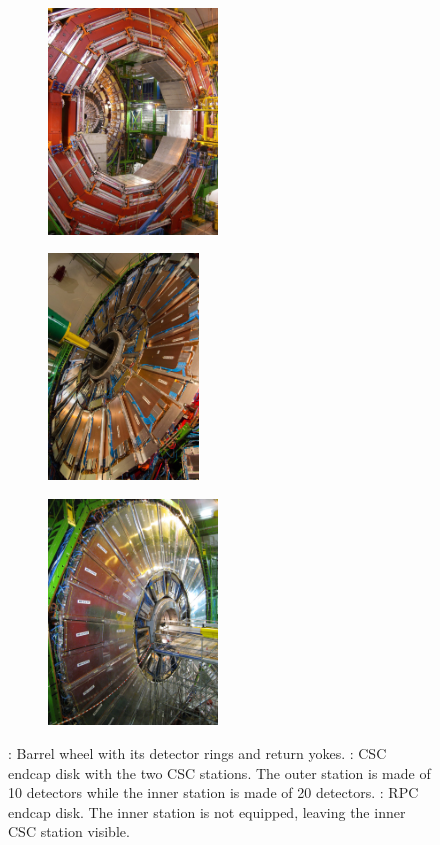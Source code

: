 	\begin{figure}[H]
		\begin{subfigure}{0.35\linewidth}
			\centering
			\includegraphics[height = 6cm]{fig/chapt2/Wheel.jpg}
			\caption{\label{fig:Muon:A}}
		\end{subfigure}
		\begin{subfigure}{0.3\linewidth}
			\centering
			\includegraphics[height = 6cm]{fig/chapt2/Disk_CSC.jpg}
			\caption{\label{fig:Muon:B}}
		\end{subfigure}
		\begin{subfigure}{0.35\linewidth}
			\centering
			\includegraphics[height = 6cm]{fig/chapt2/Disk_RPC.jpg}
			\caption{\label{fig:Muon:C}}
		\end{subfigure}
		\caption{\label{fig:Muon} : Barrel wheel with its detector rings and return yokes. : CSC endcap disk with the two CSC stations. The outer station is made of \SI{10}{\deg} detectors while the inner station is made of \SI{20}{\deg} detectors. : RPC endcap disk. The inner station is not equipped, leaving the inner CSC station visible.}
	\end{figure}
	
